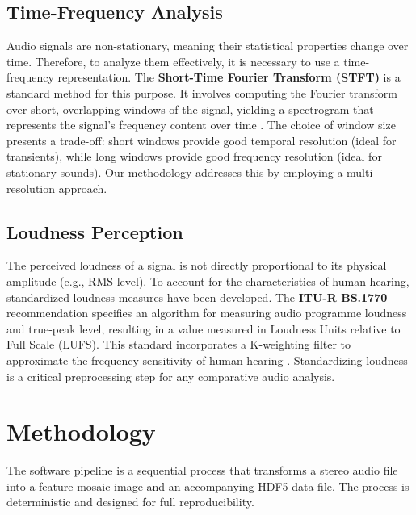 \documentclass[12pt, a4paper]{article}
\begin{document}
\subsection{Time-Frequency Analysis}
Audio signals are non-stationary, meaning their statistical properties change over time. Therefore, to analyze them effectively, it is necessary to use a time-frequency representation. The \textbf{Short-Time Fourier Transform (STFT)} is a standard method for this purpose. It involves computing the Fourier transform over short, overlapping windows of the signal, yielding a spectrogram that represents the signal's frequency content over time \cite{griffin1984signal}. The choice of window size presents a trade-off: short windows provide good temporal resolution (ideal for transients), while long windows provide good frequency resolution (ideal for stationary sounds). Our methodology addresses this by employing a multi-resolution approach.

\subsection{Loudness Perception}
The perceived loudness of a signal is not directly proportional to its physical amplitude (e.g., RMS level). To account for the characteristics of human hearing, standardized loudness measures have been developed. The \textbf{ITU-R BS.1770} recommendation specifies an algorithm for measuring audio programme loudness and true-peak level, resulting in a value measured in Loudness Units relative to Full Scale (LUFS). This standard incorporates a K-weighting filter to approximate the frequency sensitivity of human hearing \cite{itu2015bs1770}. Standardizing loudness is a critical preprocessing step for any comparative audio analysis.

\section{Methodology}
The software pipeline is a sequential process that transforms a stereo audio file into a feature mosaic image and an accompanying HDF5 data file. The process is deterministic and designed for full reproducibility.
\end{document}
